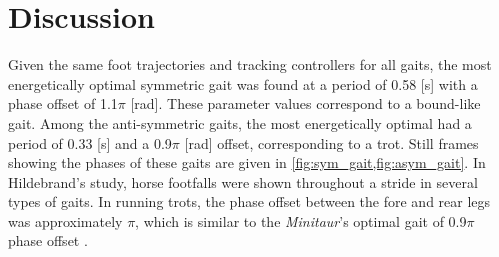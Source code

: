 \documentclass[conference,11pt,letterpaper]{IEEEtran}
\begin{document}
\section{Discussion}

Given the same foot trajectories and tracking controllers for all gaits, the most energetically optimal symmetric gait was found at a period of 0.58 [\si{\s}] with a phase offset of 1.1$\pi$ [\si{\radian}]. These parameter values correspond to a bound-like gait. Among the anti-symmetric gaits, the most energetically optimal had a period of 0.33 [\si{\s}] and a 0.9$\pi$ [\si{\radian}] offset, corresponding to a trot. Still frames showing the phases of these gaits are given in \cref{fig:sym_gait,fig:asym_gait}. In Hildebrand's study, horse footfalls were shown throughout a stride in several types of gaits. In running trots, the phase offset between the fore and rear legs was approximately $\pi$, which is similar to the \emph{Minitaur}'s optimal gait of 0.9$\pi$ phase offset \autocite{Hildebrand701}. 
\end{document}
